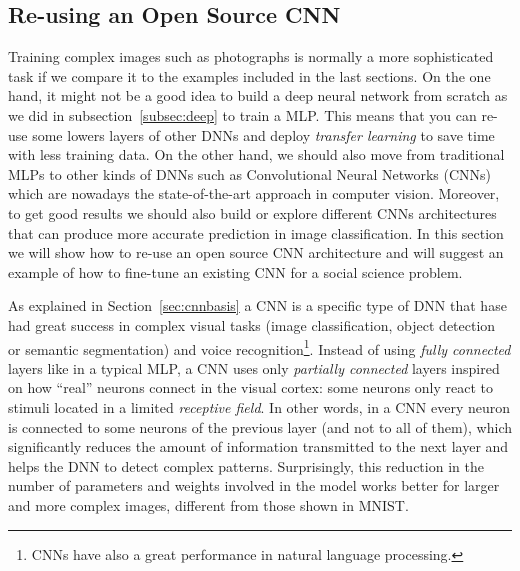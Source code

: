 \subsection{Re-using an Open Source CNN}
\label{subsec:tuning}

Training complex images such as photographs is normally a more sophisticated task if we compare it to the examples included in the last sections. On the one hand, it might not be a good idea to build a deep neural network from scratch as we did in subsection~\ref{subsec:deep} to train a MLP. This means that you can re-use some lowers layers of other DNNs and deploy \textit{transfer learning} to save time with less training data. On the other hand, we should also move from traditional MLPs to other kinds of DNNs such as Convolutional Neural Networks (CNNs) which are  nowadays the state-of-the-art approach in computer vision. Moreover, to get good results we should also build or explore different CNNs architectures that can produce more accurate prediction in image classification.  In this section we will show how to re-use an open source CNN architecture and will suggest an example of how to fine-tune an existing CNN for a social science problem.

As explained in Section~\ref{sec:cnnbasis} a CNN is a specific type of DNN that hase had great success in complex visual tasks (image classification, object detection or semantic segmentation) and voice recognition\footnote{CNNs have also a great performance in natural language processing.}. Instead of using \textit{fully connected} layers like in a typical MLP, a CNN uses only \textit{partially connected} layers inspired on how ``real'' neurons connect in the visual cortex: some neurons only react to stimuli located in a limited \textit{receptive field}. In other words, in a CNN every neuron is connected to some neurons of the previous layer (and not to all of them), which significantly reduces the amount of information transmitted to the next layer and helps the DNN to detect complex patterns. Surprisingly, this reduction in the number of parameters and weights involved in the model works better for larger and more complex images, different from those shown in MNIST.


